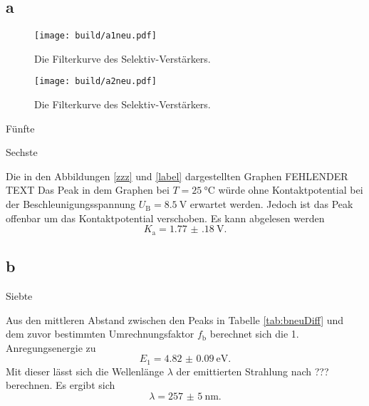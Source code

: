 \subsection{a}
\begin{figure}
	\centering
	\caption{Die Filterkurve des Selektiv-Verstärkers.}
	\texttt{[image: build/a1neu.pdf]}
	\label{fig:GraphSelektiv}
\end{figure}
\begin{figure}
	\centering
	\caption{Die Filterkurve des Selektiv-Verstärkers.}
	\texttt{[image: build/a2neu.pdf]}
	\label{fig:GraphSelektiv}
\end{figure}
\begin{table}
	\caption{Fünfte}
	\centering
	
\end{table}
\begin{table}
	\caption{Sechste}
	\centering
	
\end{table}
Die in den Abbildungen \ref{zzz} und \ref{label} dargestellten Graphen FEHLENDER TEXT
Das Peak in dem Graphen bei $T=\SI{25}{\degreeCelsius}$ würde ohne Kontaktpotential bei der Beschleunigungsspannung $U_\text{B}=\SI{8.5}{\volt}$ erwartet werden. Jedoch ist das Peak offenbar um das Kontaktpotential verschoben.
Es kann abgelesen werden
\begin{displaymath}
K_\text{a}=\SI{1.77(18)}{\volt}\text{.}
\end{displaymath}
\subsection{b}
\begin{table}
	\caption{Siebte}
	\centering
	
\end{table}
Aus den mittleren Abstand zwischen den Peaks in Tabelle \ref{tab:bneuDiff} und dem zuvor bestimmten Umrechnungsfaktor $f_\text{b}$ berechnet sich die 1. Anregungsenergie zu
\begin{displaymath}
	E_1=\SI{4.82(9)}{\electronvolt}\text{.}
\end{displaymath}
Mit dieser lässt sich die Wellenlänge $\lambda$ der emittierten Strahlung nach ??? berechnen.
Es ergibt sich
\begin{displaymath}
\lambda=\SI{257(5)}{\nano\meter}\text{.}
\end{displaymath}


